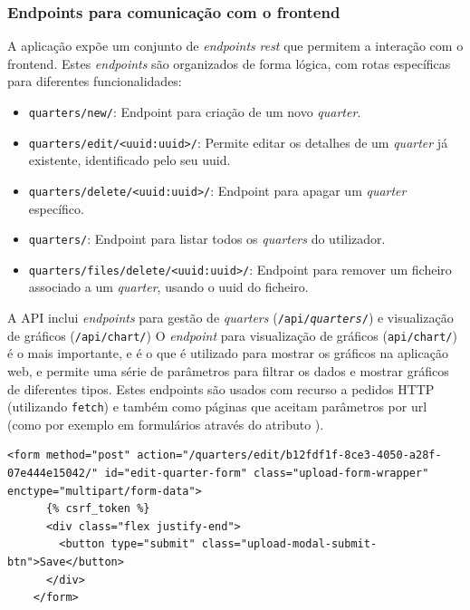 \subsubsection{Endpoints para comunicação com o frontend}

A aplicação expõe um conjunto de \textit{endpoints} \textit{rest} que permitem a interação com o frontend. Estes \textit{endpoints} são organizados de forma lógica, com rotas específicas para diferentes funcionalidades:

\begin{itemize}
    \item \texttt{quarters/new/}: Endpoint para criação de um novo \textit{quarter}.
    \item \texttt{quarters/edit/<uuid:uuid>/}: Permite editar os detalhes de um \textit{quarter} já existente, identificado pelo seu \gls{uuid}.
    \item \texttt{quarters/delete/<uuid:uuid>/}: Endpoint para apagar um \textit{quarter} específico.
    \item \texttt{quarters/}: Endpoint para listar todos os \textit{quarters} do utilizador.
    \item \texttt{quarters/files/delete/<uuid:uuid>/}: Endpoint para remover um ficheiro associado a um \textit{quarter}, usando o \gls{uuid} do ficheiro.
  \end{itemize}
  
A API inclui \textit{endpoints} para gestão de \textit{quarters} (\texttt{/api/\textit{quarters}/}) e visualização de gráficos (\texttt{/api/chart/})  O \textit{endpoint} para visualização de gráficos (\texttt{api/chart/}) é o mais importante, e é o que é utilizado para mostrar os gráficos na aplicação web, e permite uma série de parâmetros para filtrar os dados e mostrar gráficos de diferentes tipos. Estes endpoints são usados com recurso a pedidos HTTP (utilizando \texttt{fetch}) e também como páginas que aceitam parâmetros por \gls{url} (como por exemplo em formulários através do atributo ).

\begin{lstlisting}[language=\gls{html}, caption={Excerto do código \gls{html} do formulário de edição de \textit{quarter}}]
    <form method="post" action="/quarters/edit/b12fdf1f-8ce3-4050-a28f-07e444e15042/" id="edit-quarter-form" class="upload-form-wrapper" enctype="multipart/form-data">
      {% csrf_token %}
      <div class="flex justify-end">
        <button type="submit" class="upload-modal-submit-btn">Save</button>
      </div>
    </form>
    \end{lstlisting}

